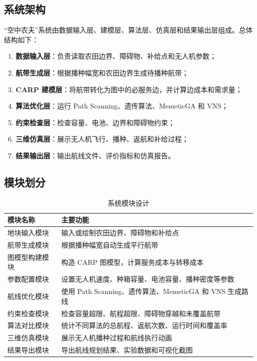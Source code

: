 \documentclass[UTF8,a4paper,12pt]{ctexart}
\begin{document}
\subsection{系统架构}

“空中农夫”系统由数据输入层、建模层、算法层、仿真层和结果输出层组成。总体结构如下：

\begin{enumerate}
    \item \textbf{数据输入层}：负责读取农田边界、障碍物、补给点和无人机参数；
    \item \textbf{航带生成层}：根据播种幅宽和农田边界生成待播种航带；
    \item \textbf{CARP 建模层}：将航带转化为图中的必服务边，并计算边成本和需求量；
    \item \textbf{算法优化层}：运行 Path Scanning、遗传算法、MemeticGA 和 VNS；
    \item \textbf{约束检查层}：检查容量、电池、边界和障碍物约束；
    \item \textbf{三维仿真层}：展示无人机飞行、播种、返航和补给过程；
    \item \textbf{结果输出层}：输出航线文件、评价指标和仿真报告。
\end{enumerate}

\subsection{模块划分}

\begin{table}[H]
\centering
\caption{系统模块设计}
\begin{tabular}{p{4cm}p{8cm}}
\toprule
模块名称 & 主要功能 \\
\midrule
地块输入模块 & 输入或绘制农田边界、障碍物和补给点 \\
航带生成模块 & 根据播种幅宽自动生成平行航带 \\
图模型构建模块 & 构造 CARP 图模型，计算服务成本与转移成本 \\
参数配置模块 & 设置无人机速度、种箱容量、电池容量、播种密度等参数 \\
航线优化模块 & 使用 Path Scanning、遗传算法、MemeticGA 和 VNS 生成路线 \\
约束检查模块 & 检查容量超限、航程超限、障碍物穿越和未覆盖航带 \\
算法对比模块 & 统计不同算法的总航程、返航次数、运行时间和覆盖率 \\
三维仿真模块 & 展示无人机播种过程和航线执行动画 \\
结果导出模块 & 导出航线规划结果、实验数据和可视化截图 \\
\bottomrule
\end{tabular}
\end{table}
\end{document}
